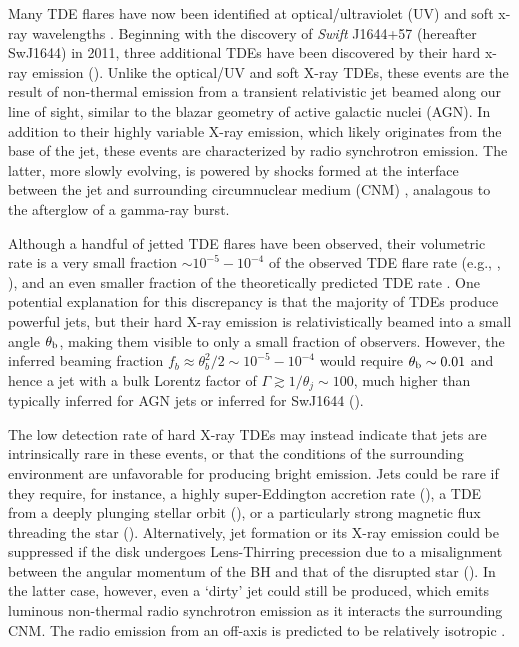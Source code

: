 \documentclass[usenatbib,fleqn]{mnras}
\begin{document}
Many TDE flares have now been identified at optical/ultraviolet (UV)
\citep{Gezari+2008, Gezari+2009, van-Velzen+2011, Gezari+2012,
  Arcavi+2014, Chornock+2014, Holoien+2014, Vinko+2015, Holoien+2016}
and soft x-ray wavelengths \citep{Bade+1996, Grupe+1999,
  Komossa&Greiner1999, Greiner+2000, Esquej+2007, Maksym+2010,
  Saxton+2012}. Beginning with the discovery of {\it Swift} J1644+57
(hereafter SwJ1644) in 2011, three additional TDEs have been
discovered by their hard x-ray emission (\citealt{Bloom+2011,
  Levan+2011, Burrows+2011, Zauderer+2011, Cenko+2012, Pasham+2015,
  Brown+2015}).  Unlike the optical/UV and soft X-ray TDEs, these
events are the result of non-thermal emission from a transient
relativistic jet beamed along our line of sight, similar to the blazar
geometry of active galactic nuclei (AGN).  In addition to their highly
variable X-ray emission, which likely originates from the base of the
jet, these events are characterized by radio synchrotron emission.
The latter, more slowly evolving, is powered by shocks formed at the
interface between the jet and surrounding circumnuclear medium (CNM)
\citep{Bloom+2011,Giannios&Metzger2011,Metzger+2012,De-Colle+2012,Mimica+2015},
analagous to the afterglow of a gamma-ray burst.

Although a handful of jetted TDE flares have been observed, their
volumetric rate is a very small fraction $\sim 10^{-5}-10^{-4}$ of the
observed TDE flare rate (e.g., \citealt{Burrows+2011},
\citealt{Brown+2015}), and an even smaller fraction of the
theoretically predicted TDE rate
\citep{Wang&Merritt2004,Stone&Metzger2016}.  One potential explanation
for this discrepancy is that the majority of TDEs produce powerful
jets, but their hard X-ray emission is relativistically beamed into a
small angle $\theta_{\rm b}$, making them visible to only a small
fraction of observers.  However, the inferred beaming fraction $f_b
\approx \theta_{b}^{2}/2 \sim 10^{-5}-10^{-4}$ would require
$\theta_{\rm b} \sim 0.01$ and hence a jet with a bulk Lorentz factor
of $\Gamma \gtrsim 1/\theta_j \sim 100$, much higher than typically
inferred for AGN jets or inferred for SwJ1644
(\citealt{Metzger+2012}).

The low detection rate of hard X-ray TDEs may instead indicate that
jets are intrinsically rare in these events, or that the conditions of the
surrounding environment are unfavorable for producing bright emission.
Jets could be rare if they require, for instance, a highly
super-Eddington accretion rate (\citealt{De-Colle+2012}), a TDE from a
deeply plunging stellar orbit (\citealt{Metzger&Stone2015}), or a
particularly strong magnetic flux threading the star
(\citealt{Tchekhovskoy+2014,Kelley+2014}).  Alternatively, jet formation
or its X-ray emission could be suppressed if the disk undergoes
Lens-Thirring precession due to a misalignment between the angular
momentum of the BH and that of the disrupted star
(\citealt{Stone&Loeb2012}).  In the latter case, however, even a `dirty'
jet could still be produced, which emits luminous non-thermal radio
synchrotron emission as it interacts the surrounding CNM.  The radio
emission from an off-axis is predicted to be relatively isotropic
\citep{Giannios&Metzger2011,Mimica+2015}.
\end{document}
